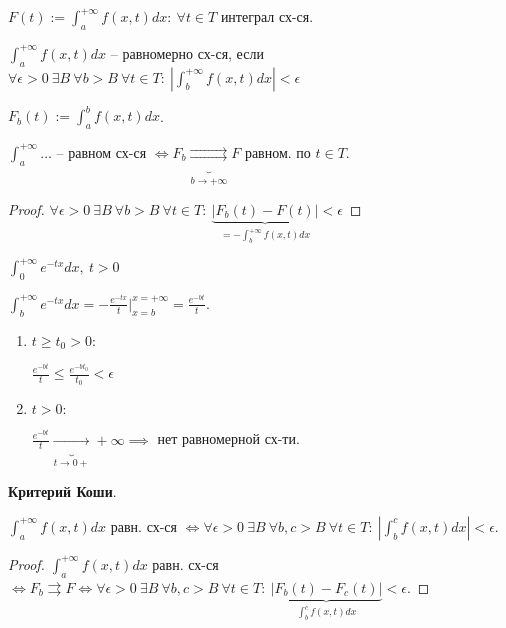 
$F(t) := \int_{a}^{+\infty} { f(x, t) dx }: \ \forall t \in T$ интеграл сх-ся.

\begin{definition}
    $\int_{a}^{+\infty} { f(x, t) dx }$ -- равномерно сх-ся, если $\forall \epsilon > 0 \ \exists B \ \forall b > B \ \forall t \in T: \ | \int_{b}^{+\infty} { f(x, t) d x } | < \epsilon$
\end{definition}

\begin{remark}
    $F_b(t) := \int_{a}^{b} { f(x, t) dx }$.

    $\int_{a}^{+\infty} { \dots }$ -- равном сх-ся $\Leftrightarrow F_b \underbrace{\rightrightarrows}_{b \rightarrow +\infty} F$ равном. по $t \in T$.
\end{remark}
\begin{proof}
    $\forall \epsilon > 0 \ \exists B \ \forall b > B \ \forall t \in T: \ \underbrace{| F_b(t) - F(t) |}_{= -\int_{b}^{+\infty} { f(x, t) d x }} < \epsilon$
\end{proof}

\begin{example}
    $\int_{0}^{+\infty} { e^{-tx} dx }, \ t > 0$

    $\int_{b}^{+\infty} { e^{-tx} dx } = -\frac{e^{-tx}}{t} |_{x=b}^{x=+\infty} = \frac{e^{-bt}}{t}$.

    \begin{enumerate}
        \item {
            $t \geq t_0 > 0:$

            $\frac{e^{-bt}}{t} \leq \frac{e^{-bt_0}}{t_0} < \epsilon$
        }
        \item {
            $t > 0:$

            $\frac{e^{-bt}}{t} \underbrace{\rightarrow}_{t \rightarrow 0+} +\infty \implies$ нет равномерной сх-ти.
        }
    \end{enumerate}
\end{example}

\begin{theorem}
    \textbf{Критерий Коши}.

    $\int_{a}^{+\infty} { f(x, t) dx }$ равн. сх-ся $\Leftrightarrow \forall \epsilon > 0 \ \exists B \ \forall b, c > B \ \forall t \in T: \ | \int_b^{c} { f(x, t) d x } | < \epsilon$.
\end{theorem}
\begin{proof}
    $ \int_{a}^{+\infty} { f(x, t) dx } $ равн. сх-ся $\Leftrightarrow F_b \rightrightarrows F \Leftrightarrow \forall \epsilon > 0 \ \exists B \ \forall b, c > B \ \forall t \in T: \ \underbrace{| F_b(t) - F_c(t) |}_{\int_{b}^{c} { f(x, t) d x }} < \epsilon$.
\end{proof}

